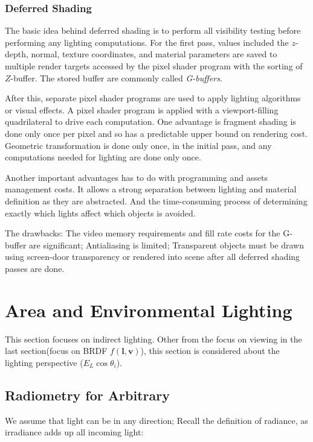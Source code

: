 \documentclass[10pt, a4paper]{article}
\begin{document}
        \subsubsection{Deferred Shading}
            The basic idea behind deferred shading is to perform all visibility testing before performing any lighting computations. For the first pass, values included the $z$-depth, normal, texture coordinates, and material parameters are saved to multiple render targets accessed by the pixel shader program with the sorting of $Z$-buffer. The stored buffer are commonly called \emph{G-buffers}. 

            After this, separate pixel shader programs are used to apply lighting algorithms or visual effects. A pixel shader program is applied with a viewport-filling quadrilateral to drive each computation.  One advantage is fragment shading is done only once per pixel and so has a predictable upper bound on rendering cost. Geometric transformation is done only once, in the initial pass, and any computations needed for lighting are done only once. 

            Another important advantages has to do with programming and assets management costs. It allows a strong separation between lighting and material definition as they are abstracted. And the time-consuming process of determining exactly which lights affect which objects is avoided. 

            The drawbacks: The video memory requirements and fill rate costs for the G-buffer are significant;  Antialiasing is limited; Transparent objects must be drawn using screen-door transparency or rendered into scene after all deferred shading passes are done. 
    \newpage

\section{Area and Environmental Lighting}
    This section focuses on indirect lighting. Other from the focus on viewing in the last section(focus on BRDF $f(\textbf{l}, \textbf{v})$), this section is considered about the lighting perspective ($E_L\cos{\theta_i}$). 
    \subsection{Radiometry for Arbitrary}

        We assume that light can be in any direction; Recall the definition of radiance, as irradiance adds up all incoming light:
\end{document}
